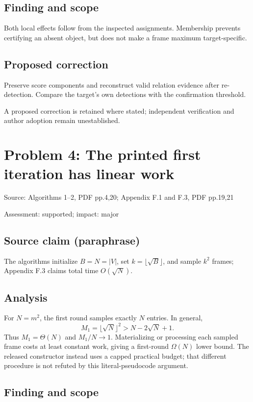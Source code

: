 \documentclass[11pt]{article}
\begin{document}
\subsection*{Finding and scope}

Both local effects follow from the inspected assignments. Membership prevents certifying an absent object, but does not make a frame maximum target-specific.

\subsection*{Proposed correction}

Preserve score components and reconstruct valid relation evidence after re-detection. Compare the target’s own detections with the confirmation threshold.

A proposed correction is retained where stated; independent verification and author adoption remain unestablished.

\section*{Problem 4: The printed first iteration has linear work}

Source: Algorithms 1–2, PDF pp.4,20; Appendix F.1 and F.3, PDF pp.19,21

Assessment: supported; impact: major

\subsection*{Source claim (paraphrase)}

The algorithms initialize \(B=N=|V|\), set \(k=\lfloor\sqrt B\rfloor\), and sample \(k^2\) frames; Appendix F.3 claims total time \(O(\sqrt N)\).

\subsection*{Analysis}

For \(N=m^2\), the first round samples exactly \(N\) entries. In general, \[M_1=\lfloor\sqrt N\rfloor^2>N-2\sqrt N+1.\] Thus \(M_1=\Theta(N)\) and \(M_1/N\to1\). Materializing or processing each sampled frame costs at least constant work, giving a first-round \(\Omega(N)\) lower bound. The released constructor instead uses a capped practical budget; that different procedure is not refuted by this literal-pseudocode argument.

\subsection*{Finding and scope}
\end{document}
